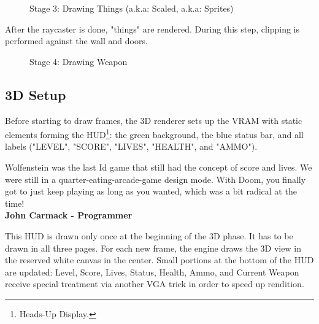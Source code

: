  
 
 \begin{figure}[H]
\centering
 \caption{Stage 3: Drawing Things (a.k.a: Scaled, a.k.a: Sprites)} 
 \end{figure}
 After the raycaster is done, "things" are rendered. During this step, clipping is performed against the wall and doors.




 \begin{figure}[H]
\centering
 \caption{Stage 4: Drawing Weapon} 
 \end{figure}
 













\subsection{3D Setup}
Before starting to draw frames, the 3D renderer sets up the VRAM with static elements forming the HUD\footnote{Heads-Up Display.}: the green background, the blue status bar, and all labels ("LEVEL", "SCORE", "LIVES", "HEALTH", and "AMMO").\\
\par
 \begin{fancyquotes}
   Wolfenstein was the last Id game that still had the concept of score and lives.  We were still in a quarter-eating-arcade-game design mode. With Doom, you finally got to just keep playing as long as you wanted, which was a bit radical at the time!
 \bigskip \\
\textbf{John Carmack - Programmer}
 \end{fancyquotes}
\begin{figure}[H]
  \centering
\end{figure}
This HUD is drawn only once at the beginning of the 3D phase. It has to be drawn in all three pages. For each new frame, the engine draws the 3D view in the reserved white canvas in the center. Small portions at the bottom of the HUD are updated: Level, Score, Lives, Status, Health, Ammo, and Current Weapon receive special treatment via another VGA trick in order to speed up rendition.\\
\par

